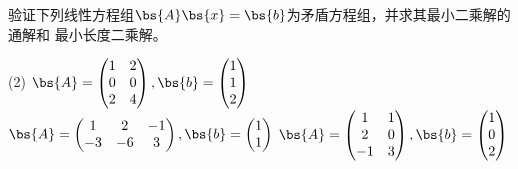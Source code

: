 \documentclass[12pt, a4paper, oneside, UTF8]{ctexbook}
\begin{document}
\begin{question}
    验证下列线性方程组$\bs{A}\bs{x}=\bs{b}$为矛盾方程组，并求其最小二乘解的通解和
    最小长度二乘解。
    \begin{tasks}[label=(\arabic*)](2)
        \task $\bs{A}=\begin{pmatrix}
            1&2\\
            0&0\\
            2&4
        \end{pmatrix},\bs{b}=\begin{pmatrix}
            1\\
            1\\
            2
        \end{pmatrix}$
        \task $\bs{A}=\begin{pmatrix}
            1&2&-1\\
            -3&-6&3
        \end{pmatrix},\bs{b}=\begin{pmatrix}
            1\\
            1
        \end{pmatrix}$
        \task $\bs{A}=\begin{pmatrix}
            1&1\\
            2&0\\
            -1&3
        \end{pmatrix},\bs{b}=\begin{pmatrix}
            1\\
            0\\
            2
        \end{pmatrix}$
    \end{tasks}
\end{question}
\end{document}
